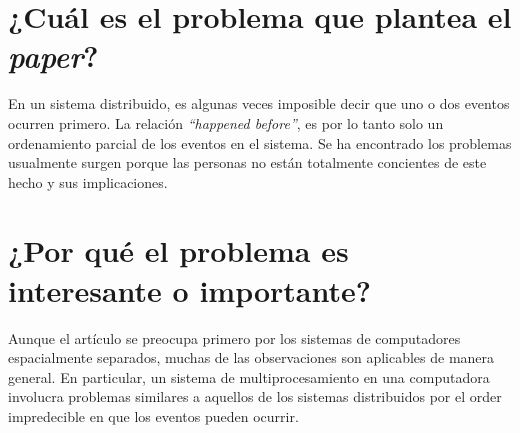 \section{¿Cuál es el problema que plantea el \textit{paper}?}
En un sistema distribuido, es algunas veces imposible decir que uno o dos eventos ocurren primero. La relación \emph{``happened before''}, es por lo tanto solo un ordenamiento parcial de los eventos en el sistema. Se ha encontrado los problemas usualmente surgen porque las personas no están totalmente concientes de este hecho y sus implicaciones.

\section{¿Por qué el problema es interesante o importante?}
Aunque el artículo se preocupa primero por los sistemas de computadores espacialmente separados, muchas de las observaciones son aplicables de manera general. En particular, un sistema de multiprocesamiento en una computadora involucra problemas similares a aquellos de los sistemas distribuidos por el order impredecible en que los eventos pueden ocurrir.

